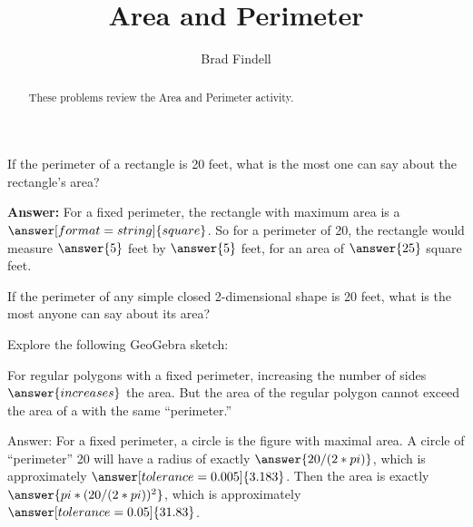 \documentclass[nooutcomes]{ximera}
\title{Area and Perimeter}
\author{Brad Findell}
\begin{document}
\begin{abstract}
These problems review the Area and Perimeter activity.  
\end{abstract}
\maketitle

%
%
%
%

\begin{problem}
If the perimeter of a rectangle is 20 feet, what is the most one can say about the rectangle's area? 

\textbf{Answer:}  For a fixed perimeter, the rectangle with maximum area is a $\answer[format=string]{square}$.  So for a perimeter of 20, the rectangle would measure $\answer{5}$ feet by $\answer{5}$ feet, for an area of $\answer{25}$ square feet.  

\begin{problem}
If the perimeter of any simple closed 2-dimensional shape is 20 feet, what is the most anyone can say about its area?

Explore the following GeoGebra sketch:  
\begin{center}  
\end{center}
For regular polygons with a fixed perimeter, increasing the number of sides
$\answer{increases}$ the area.  But the area of the regular polygon cannot 
exceed the area of a 
with the same ``perimeter.''

\begin{problem}
Answer: For a fixed perimeter, a circle is the figure with maximal area.  A circle of ``perimeter'' 20 will have a radius of exactly $\answer{20/(2*pi)}$, which is approximately 
$\answer[tolerance=0.005]{3.183}$.  
Then the area is exactly $\answer{pi*(20/(2*pi))^2}$, which is approximately 
$\answer[tolerance=0.05]{31.83}$.  
\end{problem}
\end{problem}
\end{problem}
\end{document}
